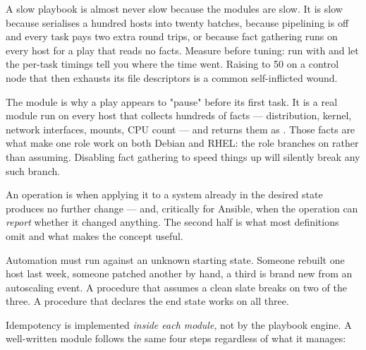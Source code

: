 \begin{perfnote}
A slow playbook is almost never slow because the modules are slow. It is slow because  serialises a hundred hosts into twenty batches, because pipelining is off and every task pays two extra round trips, or because fact gathering runs on every host for a play that reads no facts. Measure before tuning: run with  and let the per-task timings tell you where the time went. Raising  to 50 on a control node that then exhausts its file descriptors is a common self-inflicted wound.
\end{perfnote}

\begin{behind}
The  module is why a play appears to "pause" before its first task. It is a real module run on every host that collects hundreds of facts --- distribution, kernel, network interfaces, mounts, CPU count --- and returns them as . Those facts are what make one role work on both Debian and RHEL: the role branches on  rather than assuming. Disabling fact gathering to speed things up will silently break any such branch.
\end{behind}


 An operation is  when applying it to a system already in the desired state produces no further change --- and, critically for Ansible, when the operation can \emph{report} whether it changed anything. The second half is what most definitions omit and what makes the concept useful.

 Automation must run against an unknown starting state. Someone rebuilt one host last week, someone patched another by hand, a third is brand new from an autoscaling event. A procedure that assumes a clean slate breaks on two of the three. A procedure that declares the end state works on all three.

 Idempotency is implemented \emph{inside each module}, not by the playbook engine. A well-written module follows the same four steps regardless of what it manages:

